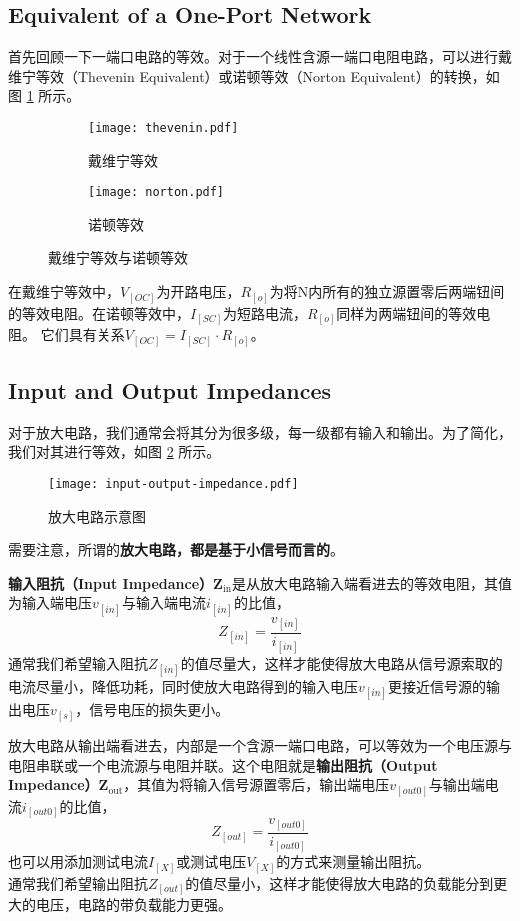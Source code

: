 \subsection{Equivalent of a One-Port Network}
首先回顾一下一端口电路的等效。对于一个线性含源一端口电阻电路，可以进行戴维宁等效（Thevenin Equivalent）或诺顿等效（Norton Equivalent）的转换，如图 \ref{fig:thevenin-norton-equivalent} 所示。
\begin{figure}[htp!]
    \centering
    \begin{subfigure}[b]{\textwidth}
        \centering
        \texttt{[image: thevenin.pdf]}
        \caption{戴维宁等效}
    \end{subfigure}
    \begin{subfigure}[b]{\linewidth}
        \centering
        \texttt{[image: norton.pdf]}
        \caption{诺顿等效}
    \end{subfigure}
    \caption{戴维宁等效与诺顿等效}
    \label{fig:thevenin-norton-equivalent}
\end{figure}

在戴维宁等效中，$V_[OC]$为开路电压，$R_[o]$为将N内所有的独立源置零后两端钮间的等效电阻。在诺顿等效中，$I_[SC]$为短路电流，$R_[o]$同样为两端钮间的等效电阻。
它们具有关系$V_[OC] = I_[SC] \cdot R_[o]$。

\subsection{Input and Output Impedances}
对于放大电路，我们通常会将其分为很多级，每一级都有输入和输出。为了简化，我们对其进行等效，如图 \ref{fig:input-output-impedance} 所示。
\begin{figure}[!htb]
    \centering
    \texttt{[image: input-output-impedance.pdf]}
    \caption{放大电路示意图}
    \label{fig:input-output-impedance}
\end{figure}
需要注意，所谓的\textbf{放大电路，都是基于小信号而言的}。

\textbf{输入阻抗（Input Impedance）}$\bm{Z_{\mathrm{in}}}$是从放大电路输入端看进去的等效电阻，其值为输入端电压$v_[in]$与输入端电流$i_[in]$的比值，
\begin{equation}
    Z_[in] = \frac{v_[in]}{i_[in]}
\end{equation}
通常我们希望输入阻抗$Z_[in]$的值尽量大，这样才能使得放大电路从信号源索取的电流尽量小，降低功耗，同时使放大电路得到的输入电压$v_[in]$更接近信号源的输出电压$v_[s]$，信号电压的损失更小。

放大电路从输出端看进去，内部是一个含源一端口电路，可以等效为一个电压源与电阻串联或一个电流源与电阻并联。这个电阻就是\textbf{输出阻抗（Output Impedance）}$\bm{Z_{\mathrm{out}}}$，其值为将输入信号源置零后，输出端电压$v_[out0]$与输出端电流$i_[out0]$的比值，
\begin{equation}
    Z_[out] = \frac{v_[out0]}{i_[out0]}
\end{equation}
也可以用添加测试电流$I_[X]$或测试电压$V_[X]$的方式来测量输出阻抗。\\
通常我们希望输出阻抗$Z_[out]$的值尽量小，这样才能使得放大电路的负载能分到更大的电压，电路的带负载能力更强。

